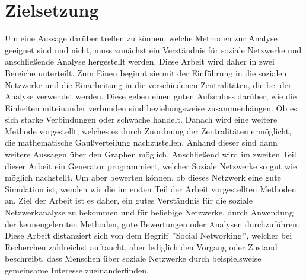 \section{Zielsetzung}\label{sec:zielsetzung}
Um eine Aussage darüber treffen zu können, welche Methoden zur Analyse geeignet sind und nicht, muss zunächst ein Verständnis für soziale Netzwerke und anschließende Analyse hergestellt werden. Diese Arbeit wird daher in zwei Bereiche unterteilt. Zum Einen beginnt sie mit der Einführung in die sozialen Netzwerke und die Einarbeitung in die verschiedenen Zentralitäten, die bei der Analyse verwendet werden. Diese geben einen guten Aufschluss darüber, wie die Einheiten miteinander verbunden sind beziehungsweise zusammenhängen. Ob es sich starke Verbindungen oder schwache handelt. Danach wird eine weitere Methode vorgestellt, welches es durch Zuordnung der Zentralitäten ermöglicht, die mathematische Gaußverteilung nachzustellen. Anhand dieser sind dann weitere Aussagen über den Graphen möglich. Anschließend wird im zweiten Teil dieser Arbeit ein Generator programmiert, welcher Soziale Netzwerke so gut wie möglich nachstellt. Um aber bewerten können, ob dieses Netzwerk eine gute Simulation ist, wenden wir die im ersten Teil der Arbeit vorgestellten Methoden an. Ziel der Arbeit ist es daher, ein gutes Verständnis für die soziale Netzwerkanalyse zu bekommen und für beliebige Netzwerke, durch Anwendung der kennengelernten Methoden, gute Bewertungen oder Analysen durchzuführen.
Diese Arbeit distanziert sich von dem Begriff $"$Social Networking$"$, welcher bei Recherchen zahlreichst auftaucht, aber lediglich den Vorgang oder Zustand beschreibt, dass Menschen über soziale Netzwerke durch beispielsweise gemeinsame Interesse zueinanderfinden. 




